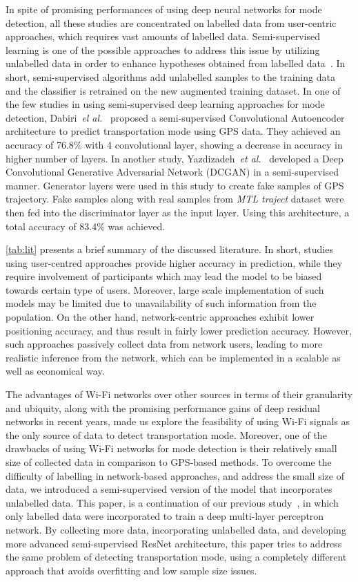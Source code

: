 In spite of promising performances of using deep neural networks for mode detection, all these studies are concentrated on labelled data from user-centric approaches, which requires vast amounts of labelled data. Semi-supervised learning is one of the possible approaches to address this issue by utilizing unlabelled data in order to enhance hypotheses obtained from labelled data~\cite{zhu05survey}. In short, semi-supervised algorithms add unlabelled samples to the training data and the classifier is retrained on the new augmented training dataset. In one of the few studies in using semi-supervised deep learning approaches for mode detection, Dabiri~\textit{el al.}~\cite{dabiri2019semi} proposed a semi-supervised Convolutional Autoencoder architecture to predict transportation mode using GPS data. They achieved an accuracy of 76.8\% with 4 convolutional layer, showing a decrease in accuracy in higher number of layers. In another study, Yazdizadeh~\textit{et al.}~\cite{yazdizadeh2019semi} developed a Deep Convolutional Generative Adversarial Network (DCGAN) in a semi-supervised manner. Generator layers were used in this study to create fake samples of GPS trajectory. Fake samples along with real samples from \textit{MTL traject} dataset were then fed into the discriminator layer as the input layer. Using this architecture, a total accuracy of 83.4\% was achieved.

\cref{tab:lit} presents a brief summary of the discussed literature. In short, studies using user-centred approaches provide higher accuracy in prediction, while they require involvement of participants which may lead the model to be biased towards certain type of users. Moreover, large scale implementation of such models may be limited due to unavailability of such information from the population. On the other hand, network-centric approaches exhibit lower positioning accuracy, and thus result in fairly lower prediction accuracy. However, such approaches passively collect data from network users, leading to more realistic inference from the network, which can be implemented in a scalable as well as economical way.


The advantages of Wi-Fi networks over other sources in terms of their granularity and ubiquity, along with the promising performance gains of deep residual networks in recent years, made us explore the feasibility of using Wi-Fi signals as the only source of data to detect transportation mode. Moreover, one of the drawbacks of using Wi-Fi networks for mode detection is their relatively small size of collected data in comparison to GPS-based methods. To overcome the difficulty of labelling in network-based approaches, and address the small size of data, we introduced a semi-supervised version of the model that incorporates unlabelled data. This paper, is a continuation of our previous study~\cite{kalatian2018mobility}, in which only labelled data were incorporated to train a deep multi-layer perceptron network. By collecting more data, incorporating unlabelled data, and developing more advanced semi-supervised ResNet architecture, this paper tries to address the same problem of detecting transportation mode, using a completely different approach that avoids overfitting and low sample size issues.


